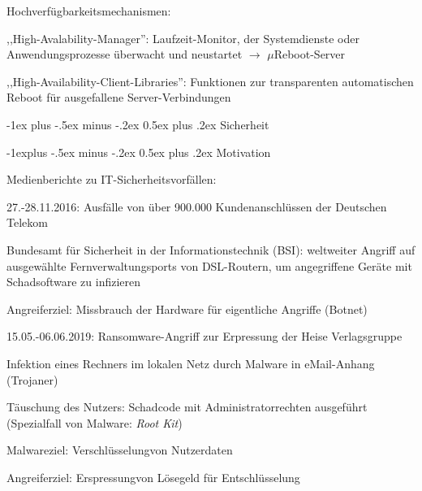 \documentclass[a4paper]{article}
\makeatletter
\renewcommand{\section}{\@startsection{section}{1}{0mm}%
 {-1ex plus -.5ex minus -.2ex}%
 {0.5ex plus .2ex}%
 {\normalfont\large\bfseries}}
\renewcommand{\subsection}{\@startsection{subsection}{2}{0mm}%
 {-1explus -.5ex minus -.2ex}%
 {0.5ex plus .2ex}%
 {\normalfont\normalsize\bfseries}}
\makeatother
\begin{document}
\begin{multicols}{3}
    Hochverfügbarkeitsmechanismen:

    \begin{enumerate*}
        \item
        ,,High-Avalability-Manager'': Laufzeit-Monitor, der Systemdienste oder
        Anwendungsprozesse überwacht und neustartet
        $\rightarrow$ $\mu$Reboot-Server
        \item
        ,,High-Availability-Client-Libraries'': Funktionen zur transparenten
        automatischen Reboot für ausgefallene Server-Verbindungen
    \end{enumerate*}


    \section{Sicherheit}


    \subsection{Motivation}

    Medienberichte zu IT-Sicherheitsvorfällen:

    \begin{itemize*}
        \item
        27.-28.11.2016: Ausfälle von über 900.000 Kundenanschlüssen der
        Deutschen Telekom
        \begin{itemize*}
            \item Bundesamt für Sicherheit in der Informationstechnik (BSI): weltweiter Angriff auf ausgewählte Fernverwaltungsports von DSL-Routern, um angegriffene Geräte mit Schadsoftware zu infizieren
            \item Angreiferziel: Missbrauch der Hardware für eigentliche Angriffe (Botnet)
        \end{itemize*}
        \item
        15.05.-06.06.2019: Ransomware-Angriff zur Erpressung der Heise
        Verlagsgruppe
        \begin{itemize*}
            \item Infektion eines Rechners im lokalen Netz durch Malware in eMail-Anhang (Trojaner)
            \item Täuschung des Nutzers: Schadcode mit Administratorrechten ausgeführt (Spezialfall von Malware: \emph{Root Kit})
            \item Malwareziel: Verschlüsselungvon Nutzerdaten
            \item Angreiferziel: Erspressungvon Lösegeld für Entschlüsselung
        \end{itemize*}
    \end{itemize*}


\end{multicols}
\end{document}
